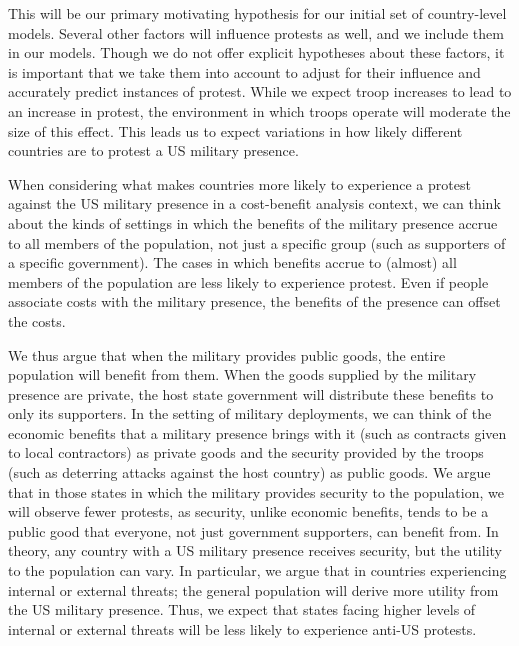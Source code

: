 		This will be our primary motivating hypothesis for our initial set of country-level models. Several other factors will influence protests as well, and we include them in our models. Though we do not offer explicit hypotheses about these factors, it is important that we take them into account to adjust for their influence and accurately predict instances of protest. While we expect troop increases to lead to an increase in protest, the environment in which troops operate will moderate the size of this effect. This leads us to expect variations in how likely different countries are to protest a US military presence.  
		
		
		When considering what makes countries more likely to experience a protest against the US military presence in a cost-benefit analysis context, we can think about the kinds of settings in which the benefits of the military presence accrue to all members of the population, not just a specific group (such as supporters of a specific government). The cases in which benefits accrue to (almost) all members of the population are less likely to experience protest. Even if people associate costs with the military presence, the benefits of the presence can offset the costs.\cite{Bitar2016}
		
		We thus argue that when the military provides public goods, the entire population will benefit from them.  When the goods supplied by the military presence are private, the host state government will distribute these benefits to only its supporters.\cite{demesquita2005} In the setting of military deployments, we can think of the economic benefits that a military presence brings with it (such as contracts given to local contractors) as private goods and the security provided by the troops (such as deterring attacks against the host country) as public goods. We argue that in those states in which the military provides security to the population, we will observe fewer protests, as security, unlike economic benefits, tends to be a public good that everyone, not just government supporters, can benefit from. In theory, any country with a US military presence receives security, but the utility to the population can vary. In particular, we argue that in countries experiencing internal or external threats; the general population will derive more utility from the US military presence. Thus, we expect that states facing higher levels of internal or external threats will be less likely to experience anti-US protests.
		
